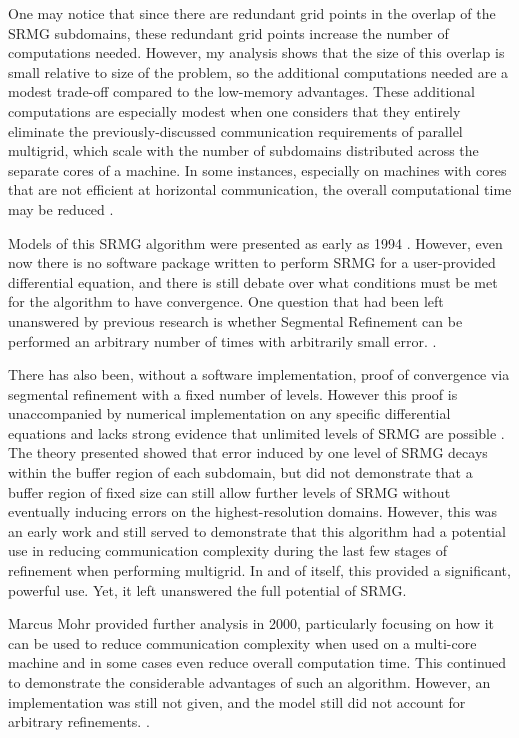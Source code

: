 \documentclass[final]{siamart1116}
\numberwithin{theorem}{section}
\begin{document}
	One may notice that since there are redundant grid points in the overlap of the SRMG subdomains, these redundant grid points increase the number of computations needed. However, my analysis shows that the size of this overlap is small relative to size of the problem, so the additional computations needed are a modest trade-off compared to the low-memory advantages. These additional computations are especially modest when one considers that they entirely eliminate the previously-discussed communication requirements of parallel multigrid, which scale with the number of subdomains distributed across the separate cores of a machine. In some instances, especially on machines with cores that are not efficient at horizontal communication, the overall computational time may be reduced \cite{id716}.
     
    Models of this SRMG algorithm were presented as early as 1994 \cite{brandtdiskin}. However, even now there is no software package written to perform SRMG for a user-provided differential equation, and there is still debate over what conditions must be met for the algorithm to have convergence. One question that had been left unanswered by previous research is whether Segmental Refinement can be performed an arbitrary number of times with arbitrarily small error. \cite{paper1}. 

	There has also been, without a software implementation, proof of convergence via segmental refinement with a fixed number of levels. However this proof is unaccompanied by numerical implementation on any specific differential equations and lacks strong evidence that unlimited levels of SRMG are possible \cite{brandtdiskin}. The theory  presented showed that error induced by one level of SRMG decays within the buffer region of each subdomain, but did not demonstrate that a buffer region of fixed size can still allow further levels of SRMG  without eventually inducing errors on the highest-resolution domains. However, this was an early work and still served to demonstrate that this algorithm had a potential use in reducing communication complexity during the last few stages of refinement when performing multigrid. In and of itself, this provided a significant, powerful use. Yet, it left unanswered the full potential of SRMG.
    
    
    
    Marcus Mohr provided further analysis in 2000, particularly focusing on how it can be used to reduce communication complexity when used on a multi-core machine and in some cases even reduce overall computation time. This continued to demonstrate the considerable advantages of such an algorithm. However, an implementation was still not given, and the model still did not account for arbitrary refinements. \cite{id716}. 
    
\end{document}
